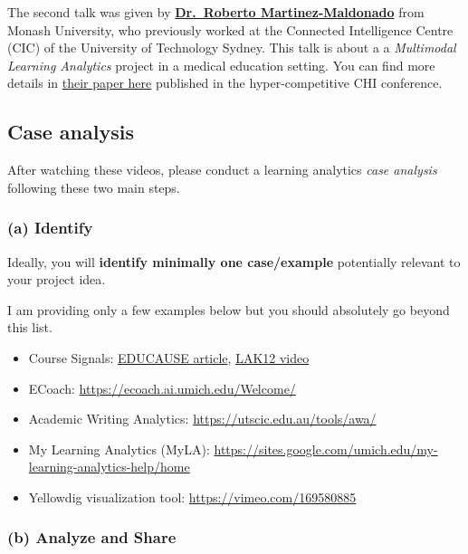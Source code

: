 \documentclass[
]{book}
\providecommand{\tightlist}{%
  \setlength{\itemsep}{0pt}\setlength{\parskip}{0pt}}
\begin{document}
The second talk was given by \textbf{\href{http://roberto.martinezmaldonado.net/}{Dr.~Roberto Martinez-Maldonado}} from Monash University, who previously worked at the Connected Intelligence Centre (CIC) of the University of Technology Sydney. This talk is about a a \emph{Multimodal Learning Analytics} project in a medical education setting. You can find more details in \href{https://dl.acm.org/doi/abs/10.1145/3313831.3376148}{their paper here} published in the hyper-competitive CHI conference.

\hypertarget{case-analysis}{%
\subsection{Case analysis}\label{case-analysis}}

After watching these videos, please conduct a learning analytics \emph{case analysis} following these two main steps.

\hypertarget{a-identify}{%
\subsubsection*{(a) Identify}\label{a-identify}}

Ideally, you will \textbf{identify minimally one case/example} potentially relevant to your project idea.

I am providing only a few examples below but you should absolutely go beyond this list.

\begin{itemize}
\tightlist
\item
  Course Signals: \href{https://er.educause.edu/articles/2010/3/signals-applying-academic-analytics}{EDUCAUSE article}, \href{https://www.youtube.com/watch?v=kURsmrkdS04}{LAK12 video}
\item
  ECoach: \url{https://ecoach.ai.umich.edu/Welcome/}
\item
  Academic Writing Analytics: \url{https://utscic.edu.au/tools/awa/}
\item
  My Learning Analytics (MyLA): \url{https://sites.google.com/umich.edu/my-learning-analytics-help/home}
\item
  Yellowdig visualization tool: \url{https://vimeo.com/169580885}
\end{itemize}

\hypertarget{b-analyze-and-share}{%
\subsubsection*{(b) Analyze and Share}\label{b-analyze-and-share}}
\end{document}
